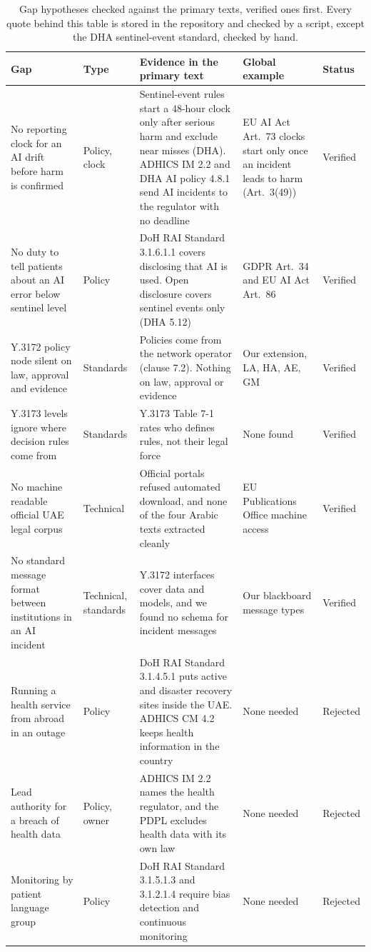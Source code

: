 \documentclass[10pt,twocolumn]{article}
\begin{document}
\begin{table}[t]
\centering\footnotesize
\begin{tabularx}{\textwidth}{@{}p{4.3cm}p{1.5cm}Lp{3.4cm}p{1.2cm}@{}}
\toprule
\textbf{Gap} & \textbf{Type} & \textbf{Evidence in the primary text} & \textbf{Global example} & \textbf{Status}\\
\midrule
No reporting clock for an AI drift before harm is confirmed & Policy, clock & Sentinel-event rules start a 48-hour clock only after serious harm and exclude near misses (DHA). ADHICS IM 2.2 and DHA AI policy 4.8.1 send AI incidents to the regulator with no deadline & EU AI Act Art.~73 clocks start only once an incident leads to harm (Art.~3(49)) & Verified\\
No duty to tell patients about an AI error below sentinel level & Policy & DoH RAI Standard 3.1.6.1.1 covers disclosing that AI is used. Open disclosure covers sentinel events only (DHA 5.12) & GDPR Art.~34 and EU AI Act Art.~86 & Verified\\
Y.3172 policy node silent on law, approval and evidence & Standards & Policies come from the network operator (clause 7.2). Nothing on law, approval or evidence & Our extension, LA, HA, AE, GM & Verified\\
Y.3173 levels ignore where decision rules come from & Standards & Y.3173 Table 7\mbox{-}1 rates who defines rules, not their legal force & None found & Verified\\
No machine readable official UAE legal corpus & Technical & Official portals refused automated download, and none of the four Arabic texts extracted cleanly & EU Publications Office machine access & Verified\\
No standard message format between institutions in an AI incident & Technical, standards & Y.3172 interfaces cover data and models, and we found no schema for incident messages & Our blackboard message types & Verified\\
\midrule
Running a health service from abroad in an outage & Policy & DoH RAI Standard 3.1.4.5.1 puts active and disaster recovery sites inside the UAE. ADHICS CM 4.2 keeps health information in the country & None needed & Rejected\\
Lead authority for a breach of health data & Policy, owner & ADHICS IM 2.2 names the health regulator, and the PDPL excludes health data with its own law & None needed & Rejected\\
Monitoring by patient language group & Policy & DoH RAI Standard 3.1.5.1.3 and 3.1.2.1.4 require bias detection and continuous monitoring & None needed & Rejected\\
\bottomrule
\end{tabularx}
\caption{Gap hypotheses checked against the primary texts, verified ones first. Every quote behind this table is stored in the repository and checked by a script, except the DHA sentinel-event standard, checked by hand.}
\label{tab:gaps}
\end{table}
\end{document}
